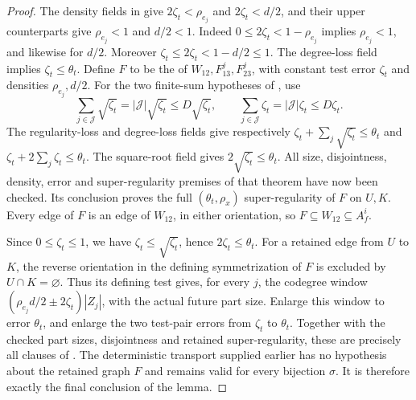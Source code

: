 \begin{proof}
The density fields in  give
$2\zeta_t<\rho_{e_j}$ and $2\zeta_t<d/2$, and their upper counterparts
give $\rho_{e_j}<1$ and $d/2<1$. Indeed
$0\le2\zeta_t<1-\rho_{e_j}$ implies $\rho_{e_j}<1$, and likewise for
$d/2$. Moreover $\zeta_t\le2\zeta_t<1-d/2\le1$.
The degree-loss field implies $\zeta_t\le\theta_t$.
Define $F$ to be the  of
$W_{12},F_{13}^j,F_{23}^j$, with constant test error $\zeta_t$ and
densities $\rho_{e_j},d/2$.
For the two finite-sum hypotheses of
, use
\[
 \sum_{j\in\mathcal J}\sqrt{\zeta_t}
   =|\mathcal J|\sqrt{\zeta_t}\le D\sqrt{\zeta_t},\qquad
 \sum_{j\in\mathcal J}\zeta_t
   =|\mathcal J|\zeta_t\le D\zeta_t.
\]
The regularity-loss and degree-loss fields give respectively
$\zeta_t+\sum_j\sqrt{\zeta_t}\le\theta_t$ and
$\zeta_t+2\sum_j\zeta_t\le\theta_t$.
The square-root field gives $2\sqrt{\zeta_t}\le\theta_t$.
All size, disjointness, density, error and super-regularity premises
of that theorem have now been checked. Its conclusion proves the full
$(\theta_t,\rho_x)$ super-regularity of $F$ on $U,K$.
Every edge of $F$ is an edge of $W_{12}$, in either orientation, so
$F\subseteq W_{12}\subseteq A_f^i$.

Since $0\le\zeta_t\le1$, we have $\zeta_t\le\sqrt{\zeta_t}$, hence
$2\zeta_t\le\theta_t$. For a retained edge from $U$ to $K$, the
reverse orientation in the defining symmetrization of $F$ is excluded
by $U\cap K=\varnothing$. Thus its defining test gives, for every $j$,
the codegree window
$(\rho_{e_j}d/2\pm2\zeta_t)|Z_j|$, with the actual future part size.
Enlarge this window to error $\theta_t$, and enlarge the two test-pair
errors from $\zeta_t$ to $\theta_t$. Together with the checked part
sizes, disjointness and retained super-regularity, these are precisely
all clauses of .
The deterministic transport supplied earlier has no hypothesis about
the retained graph $F$ and remains valid for every bijection $\sigma$.
It is therefore exactly the final conclusion of the lemma.
\end{proof}
